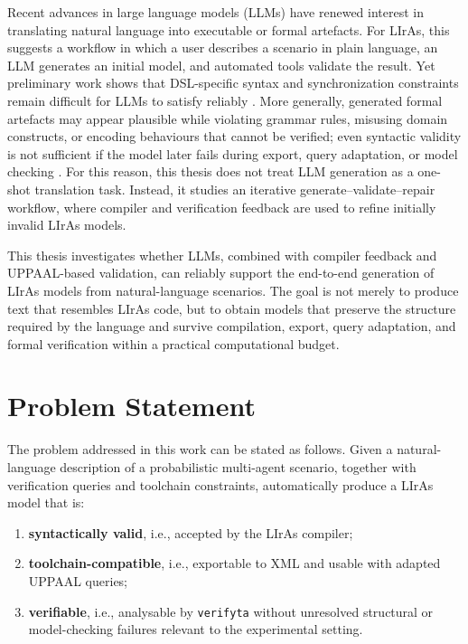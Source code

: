 Recent advances in large language models (LLMs) have renewed interest in translating natural language into executable or formal artefacts.
For LIrAs, this suggests a workflow in which a user describes a scenario in plain language, an LLM generates an initial model, and automated tools validate the result.
Yet preliminary work shows that DSL-specific syntax and synchronization constraints remain difficult for LLMs to satisfy reliably \cite{tagliaferro2025preliminary}.
More generally, generated formal artefacts may appear plausible while violating grammar rules, misusing domain constructs, or encoding behaviours that cannot be verified; even syntactic validity is not sufficient if the model later fails during export, query adaptation, or model checking \cite{tagliaferro2026agentic}.
For this reason, this thesis does not treat LLM generation as a one-shot translation task.
Instead, it studies an iterative generate--validate--repair workflow, where compiler and verification feedback are used to refine initially invalid LIrAs models.

This thesis investigates whether LLMs, combined with compiler feedback and UPPAAL-based validation, can reliably support the end-to-end generation of LIrAs models from natural-language scenarios.
The goal is not merely to produce text that resembles LIrAs code, but to obtain models that preserve the structure required by the language and survive compilation, export, query adaptation, and formal verification within a practical computational budget.

\section{Problem Statement}
\label{sec:problem_statement}

The problem addressed in this work can be stated as follows.
Given a natural-language description of a probabilistic multi-agent scenario, together with verification queries and toolchain constraints, automatically produce a LIrAs model that is:

\begin{enumerate}
    \item \textbf{syntactically valid}, i.e., accepted by the LIrAs compiler;
    \item \textbf{toolchain-compatible}, i.e., exportable to XML and usable with adapted UPPAAL queries;
    \item \textbf{verifiable}, i.e., analysable by \texttt{verifyta} without unresolved structural or model-checking failures relevant to the experimental setting.
\end{enumerate}

